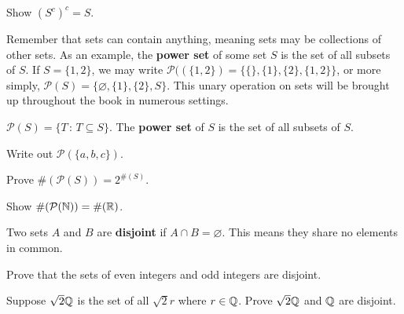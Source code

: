\begin{exercise}
	Show $\left(S^c\right)^c = S$. 
\end{exercise}

Remember that sets can contain anything, meaning sets may be collections of other sets. As an example, the \textbf{power set} of some set $S$ is the set of all subsets of $S$. If $S=\{1,2\}$, we may write $\mathcal{P}((\{1,2\})=\{\{\},\{1\},\{2\},\{1,2\}\}$, or more simply, $\mathcal{P}(S)=\{\varnothing,\{1\},\{2\},S\}$. This unary operation on sets will be brought up throughout the book in numerous settings. \\

\begin{definition}
	$\mathcal{P}(S)=\{T\,:\, T\subseteq S\}$. The \textbf{power set} of $S$ is the set of all subsets of $S$. 
\end{definition}

\begin{exercise}
	Write out $\mathcal{P}(\{a,b,c\})$.
\end{exercise}
    \vspace{-3mm}

\begin{exercise}
	Prove $\#(\mathcal{P}(S))=2^{\#(S)}$.
\end{exercise}
    \vspace{-3mm}

\begin{exercise}[Challenge]
	Show $\#(\mathcal{P}(\mathbb{N}))=\#(\mathbb{R})$.
\end{exercise}
\clearpage

\begin{definition}
    Two sets $A$ and $B$ are \textbf{disjoint} if $A\cap B=\varnothing$. This means they share no elements in common.
\end{definition}

\begin{exercise}
    Prove that the sets of even integers and odd integers are disjoint. 
\end{exercise}
    \vspace{-4mm}

\begin{exercise}
    Suppose $\sqrt{2}\mathbb{Q}$ is the set of all $\sqrt{2}r$ where $r\in\mathbb{Q}$. Prove $\sqrt{2}\mathbb{Q}$ and $\mathbb{Q}$ are disjoint. 
\end{exercise}
    \vspace{-4mm}

